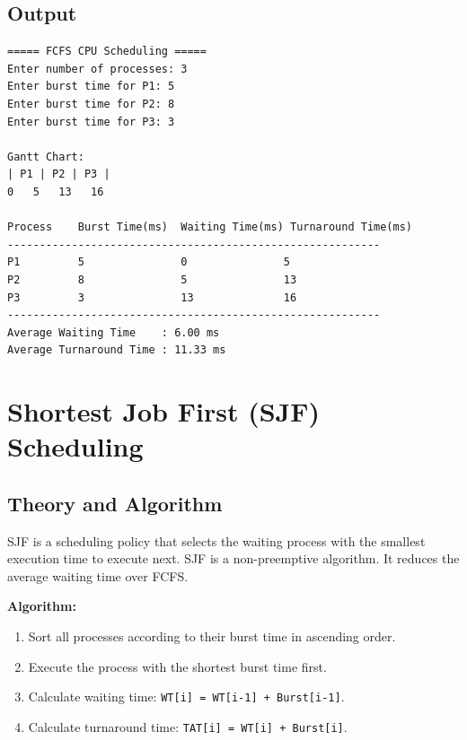 \documentclass[12pt,a4paper]{article}
\begin{document}
\subsection{Output}
\begin{verbatim}
===== FCFS CPU Scheduling =====
Enter number of processes: 3
Enter burst time for P1: 5
Enter burst time for P2: 8
Enter burst time for P3: 3

Gantt Chart:
| P1 | P2 | P3 |
0   5   13   16

Process    Burst Time(ms)  Waiting Time(ms) Turnaround Time(ms)
----------------------------------------------------------
P1         5               0               5              
P2         8               5               13             
P3         3               13              16             
----------------------------------------------------------
Average Waiting Time    : 6.00 ms
Average Turnaround Time : 11.33 ms
\end{verbatim}

\newpage
\section{Shortest Job First (SJF) Scheduling}

\subsection{Theory and Algorithm}
SJF is a scheduling policy that selects the waiting process with the smallest execution time to execute next. SJF is a non-preemptive algorithm. It reduces the average waiting time over FCFS.

\textbf{Algorithm:}
\begin{enumerate}
    \item Sort all processes according to their burst time in ascending order.
    \item Execute the process with the shortest burst time first.
    \item Calculate waiting time: \texttt{WT[i] = WT[i-1] + Burst[i-1]}.
    \item Calculate turnaround time: \texttt{TAT[i] = WT[i] + Burst[i]}.
\end{enumerate}
\end{document}
